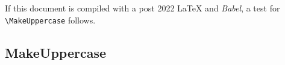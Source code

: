\documentclass[a4paper]{scrartcl}
\newcommand{\cs}[1]{\texttt{\textbackslash#1}}
\begin{document}
\subsubsection{\GreekExtendedXIII}
\subsubsection{\GreekExtendedXIV}
\subsubsection{\GreekExtendedXV}
\subsubsection{\GreekExtendedXVI}

If this document is compiled with a post 2022 LaTeX and \emph{Babel},
a test for \cs{MakeUppercase} follows.

\ifdefined \AddToNoCaseChangeList

  \subsection{MakeUppercase}

  \ifdefined \extrasgreek
  \fi

  \subsubsection{\MakeUppercase{\GreekAndCopticI}}
  \subsubsection{\MakeUppercase{\GreekAndCopticII}}
  \subsubsection{\MakeUppercase{\GreekAndCopticIII}}
  \subsubsection{\MakeUppercase{\GreekAndCopticIV}}
  \subsubsection{\MakeUppercase{\GreekAndCopticV}}
\end{document}
